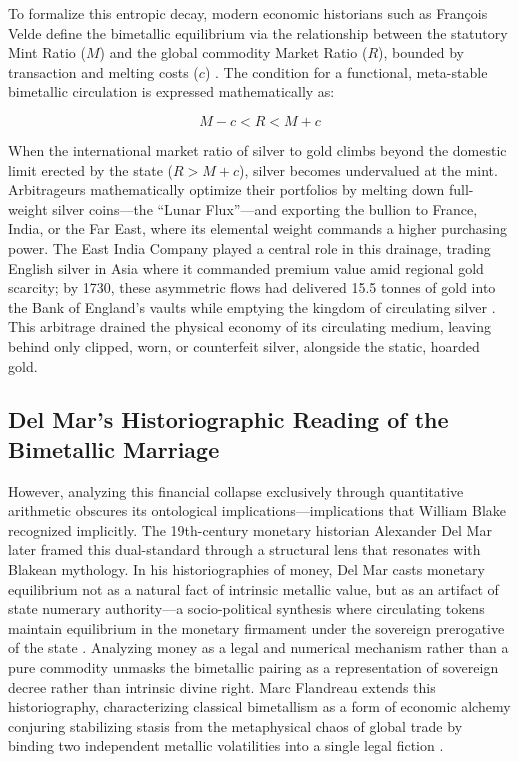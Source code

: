 \documentclass[
]{article}
\begin{document}
To formalize this entropic decay, modern economic historians such as
François Velde define the bimetallic equilibrium via the relationship
between the statutory Mint Ratio (\(M\)) and the global commodity Market
Ratio (\(R\)), bounded by transaction and melting costs (\(c\))
\citep{velde2005bimetallism}. The condition for a functional,
meta-stable bimetallic circulation is expressed mathematically as:

\begin{equation}
\label{eq:bimetallic_bounds}
M - c < R < M + c
\end{equation}

When the international market ratio of silver to gold climbs beyond the
domestic limit erected by the state (\(R > M + c\)), silver becomes
undervalued at the mint. Arbitrageurs mathematically optimize their
portfolios by melting down full-weight silver coins---the ``Lunar
Flux''---and exporting the bullion to France, India, or the Far East,
where its elemental weight commands a higher purchasing power. The East
India Company played a central role in this drainage, trading English
silver in Asia where it commanded premium value amid regional gold
scarcity; by 1730, these asymmetric flows had delivered 15.5 tonnes of
gold into the Bank of England's vaults while emptying the kingdom of
circulating silver \citep{quinn2007recoinage}. This arbitrage drained
the physical economy of its circulating medium, leaving behind only
clipped, worn, or counterfeit silver, alongside the static, hoarded
gold.

\subsection{Del Mar's Historiographic Reading of the Bimetallic
Marriage}\label{del-mars-historiographic-reading-of-the-bimetallic-marriage}

However, analyzing this financial collapse exclusively through
quantitative arithmetic obscures its ontological
implications---implications that William Blake recognized implicitly.
The 19th-century monetary historian Alexander Del Mar later framed this
dual-standard through a structural lens that resonates with Blakean
mythology. In his historiographies of money, Del Mar casts monetary
equilibrium not as a natural fact of intrinsic metallic value, but as an
artifact of state numerary authority---a socio-political synthesis where
circulating tokens maintain equilibrium in the monetary firmament under
the sovereign prerogative of the state \citep{delmar1895history}.
Analyzing money as a legal and numerical mechanism rather than a pure
commodity unmasks the bimetallic pairing as a representation of
sovereign decree rather than intrinsic divine right. Marc Flandreau
extends this historiography, characterizing classical bimetallism as a
form of economic alchemy conjuring stabilizing stasis from the
metaphysical chaos of global trade by binding two independent metallic
volatilities into a single legal fiction
\citep{flandreau1996bimetallism}.
\end{document}
